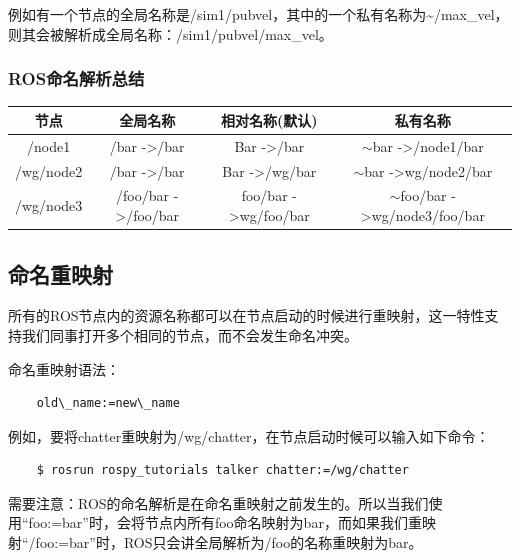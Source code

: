 \documentclass[9pt, oneside]{book}
\begin{document}
例如有一个节点的全局名称是/sim1/pubvel，其中的一个私有名称为\textasciitilde/max\_vel，则其会被解析成全局名称：/sim1/pubvel/max\_vel。

\subsubsection{ROS命名解析总结}

\begin{table}[H]
    \begin{tabular}{c|c|c|c}
    \hline
    节点        & 全局名称                            & 相对名称(默认)                         & 私有名称                                         \\ \hline
    /node1    & /bar -\textgreater /bar         & Bar -\textgreater /bar           & $\sim$bar -\textgreater /node1/bar           \\ \hline
    /wg/node2 & /bar -\textgreater /bar         & Bar -\textgreater /wg/bar        & $\sim$bar -\textgreater wg/node2/bar         \\ \hline
    /wg/node3 & /foo/bar -\textgreater /foo/bar & foo/bar -\textgreater wg/foo/bar & $\sim$foo/bar -\textgreater wg/node3/foo/bar \\ \hline
    \end{tabular}
\end{table}

\subsection{命名重映射}

所有的ROS节点内的资源名称都可以在节点启动的时候进行重映射，这一特性支持我们同事打开多个相同的节点，而不会发生命名冲突。

命名重映射语法：

\begin{verbatim}
    old\_name:=new\_name
\end{verbatim}

例如，要将chatter重映射为/wg/chatter，在节点启动时候可以输入如下命令：

\begin{verbatim}
    $ rosrun rospy_tutorials talker chatter:=/wg/chatter 
\end{verbatim}

需要注意：ROS的命名解析是在命名重映射之前发生的。所以当我们使用“foo:=bar”时，会将节点内所有foo命名映射为bar，而如果我们重映射“/foo:=bar”时，ROS只会讲全局解析为/foo的名称重映射为bar。
\end{document}

